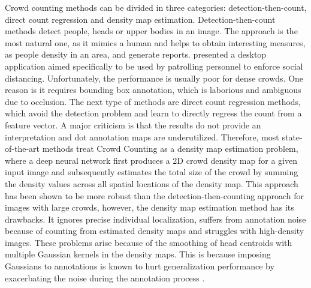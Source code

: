 Crowd counting methods can be divided in three categories: detection-then-count, direct count regression and density map estimation. Detection-then-count methods detect people, heads or upper bodies in an image. 
The approach is the most natural one, as it mimics a human and helps to obtain interesting measures, as people density in an area, and generate reports.
\cite{CLIPnose} presented a desktop application aimed specifically to be used by patrolling personnel to enforce social distancing. 
Unfortunately, the performance is usually poor for dense crowds. One reason is it requires bounding box annotation, which is laborious and ambiguous due to occlusion. 
The next type of methods are direct count regression methods, which avoid the detection problem and learn to directly regress the count from a feature vector. A major criticism is that the results do not provide an interpretation and dot annotation maps are underutilized. Therefore, most state-of-the-art methods treat Crowd Counting as a density map estimation problem, where a deep neural network first produces a 2D crowd density map for a given input image and subsequently estimates the total size of the crowd by summing the density values across all spatial locations of the density map. This approach has been shown to be more robust than the detection-then-counting approach for images with large crowds, however, the density map estimation method has its drawbacks.
It ignores precise individual localization, suffers from annotation noise because of counting from estimated density maps and struggles with high-density images. These problems arise because of the smoothing of head centroids with multiple Gaussian kernels in the density maps. %
This is because imposing Gaussians to annotations is known to hurt generalization performance by exacerbating the noise during the annotation process \citep{FGENet, DMCount}.\\






%

